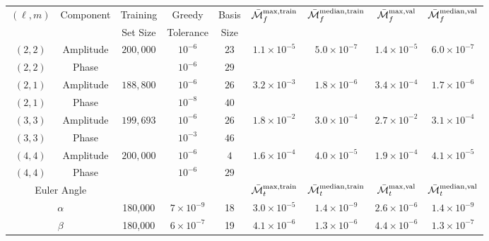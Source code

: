 \documentclass[prd,amssymb,amsmath,amsfonts,superscriptaddress,nofootinbib,reprint,showpacs, longbibliography]{revtex4-1}
\begin{document}
\begin{table}[t!]
    \centering
    \begin{tabular}{c|c|c|c|c|c|c|c|c}
    \hline
    \hline
    \multirow{2}{*}{$(\ell,m)$} & \multirow{2}{*}{Component} & Training & Greedy & Basis & \multirow{2}{*}{$\bar{\mathcal{M}}_f^{\rm max,train}$} & \multirow{2}{*}{$\bar{\mathcal{M}}_f^{\rm median,train}$}& \multirow{2}{*}{$\bar{\mathcal{M}}_f^{\rm max,val}$} & \multirow{2}{*}{$\bar{\mathcal{M}}_f^{\rm median,val}$}\\
     & & Set Size & Tolerance & Size & & & &\\
    \hline
    $(2,2)$ & Amplitude & \multirow{2}{*}{$200,000$} & $10^{-6}$ & $23$ & \multirow{2}{*}{$1.1\times10^{-5}$} & \multirow{2}{*}{$5.0\times10^{-7}$} & \multirow{2}{*}{$1.4\times10^{-5}$} & \multirow{2}{*}{$6.0\times10^{-7}$} \\
    $(2,2)$ & Phase & & $10^{-6}$ & $29$ & & & &\\
    \hline
    $(2,1)$ & Amplitude & \multirow{2}{*}{$188,800$} & $10^{-6}$ & $26$ & \multirow{2}{*}{$3.2\times10^{-3}$} & \multirow{2}{*}{$1.8\times10^{-6}$}& \multirow{2}{*}{$3.4\times10^{-4}$} & \multirow{2}{*}{$1.7\times10^{-6}$}\\
    $(2,1)$ & Phase & & $10^{-8}$ & $40$ & & & &\\
    \hline
    $(3,3)$ & Amplitude & \multirow{2}{*}{$199,693$} & $10^{-6}$ & $26$ & \multirow{2}{*}{$1.8\times10^{-2}$} & \multirow{2}{*}{$3.0\times10^{-4}$} & \multirow{2}{*}{$2.7\times10^{-2}$} & \multirow{2}{*}{$3.1\times10^{-4}$}\\
    $(3,3)$ & Phase & & $10^{-3}$ & $46$ & & & &\\
    \hline
    $(4,4)$ & Amplitude  & \multirow{2}{*}{$200,000$} & $10^{-6}$ & $4$ & \multirow{2}{*}{$1.6\times10^{-4}$} & \multirow{2}{*}{$4.0\times10^{-5}$} & \multirow{2}{*}{$1.9\times10^{-4}$} & \multirow{2}{*}{$4.1\times10^{-5}$}\\
    $(4,4)$ & Phase  & & $10^{-6}$ & $29$ & & & &\\
    \hline
    \hline
    \multicolumn{2}{c|}{Euler Angle} & \multicolumn{3}{|c|}{} & $\bar{\mathcal{M}}_t^{\rm max,train}$ & $\bar{\mathcal{M}}_t^{\rm median,train}$ & $\bar{\mathcal{M}}_t^{\rm max,val}$ & $\bar{\mathcal{M}}_t^{\rm median,val}$\\
    \hline
    \multicolumn{2}{c|}{$\alpha$} & 180,000 & $7 \times 10^{-9}$ & 18 & $3.0 \times 10^{-5}$ &$1.4 \times 10^{-9}$ & $2.6 \times 10^{-6}$ & $1.4 \times 10^{-9}$\\
    \multicolumn{2}{c|}{$\beta$} & 180,000 & $6 \times 10^{-7}$ & 19 & $4.1 \times 10^{-6}$ & $1.3 \times 10^{-6}$ & $4.4 \times 10^{-6}$ & $1.3 \times 10^{-7}$\\

\end{tabular}
\end{table}
\end{document}
